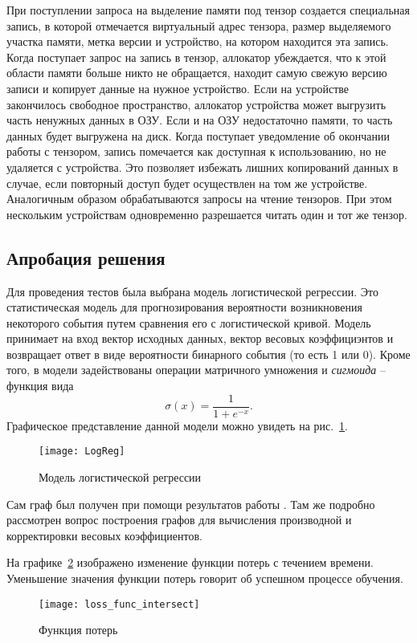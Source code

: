 При поступлении запроса на выделение памяти под тензор создается специальная
запись, в которой отмечается виртуальный адрес тензора, размер выделяемого
участка памяти, метка версии и устройство, на котором находится эта запись.
Когда поступает запрос на запись в тензор, аллокатор убеждается, что к этой
области памяти больше никто не обращается, находит самую свежую версию записи
и копирует данные на нужное устройство. Если на устройстве закончилось свободное
пространство, аллокатор устройства может выгрузить часть ненужных данных в ОЗУ.
Если и на ОЗУ недостаточно памяти, то часть данных будет выгружена на диск.
Когда поступает уведомление об окончании работы с тензором, запись помечается
как доступная к использованию, но не удаляется с устройства. Это позволяет
избежать лишних копирований данных в случае, если повторный доступ будет
осуществлен на том же устройстве. Аналогичным образом обрабатываются запросы
на чтение тензоров. При этом нескольким устройствам одновременно разрешается
читать один и тот же тензор.

\subsection{Апробация решения}

Для проведения тестов была выбрана модель логистической регрессии. Это статистическая
модель для прогнозирования вероятности возникновения некоторого события путем
сравнения его с логистической кривой. Модель принимает на вход вектор исходных
данных, вектор весовых коэффициэнтов и возвращает ответ в виде вероятности
бинарного события (то есть 1 или 0). Кроме того, в модели задействованы операции
матричного умножения и \textit{сигмоида} -- функция вида \[
  \sigma(x) = \frac{1}{1 + e^{-x}}.
\]
Графическое представление данной модели можно увидеть на рис.~\ref{fig:logreg}.

\begin{figure}[h]
  \centering
  \texttt{[image: LogReg]}
  \caption{Модель логистической регрессии}
  \label{fig:logreg}
\end{figure}

Сам граф был получен при помощи результатов работы \cite{graph}. Там же подробно
рассмотрен вопрос построения графов для вычисления производной и корректировки
весовых коэффициентов.

На графике~\ref{fig:loss} изображено изменение функции потерь с течением времени.
Уменьшение значения функции потерь говорит об успешном процессе обучения.
\begin{figure}[h]
  \centering
  \texttt{[image: loss\_func\_intersect]}
  \caption{Функция потерь}
  \label{fig:loss}
\end{figure}


